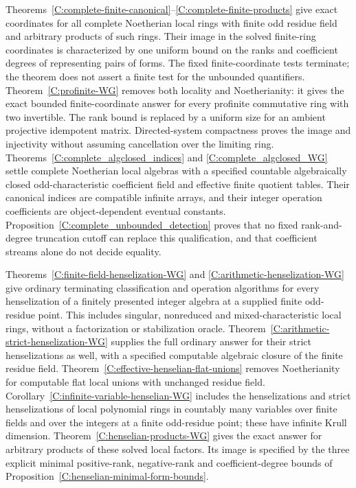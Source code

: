 \begin{remark}
Theorems~\ref{C:complete-finite-canonical}--\ref{C:complete-finite-products}
give exact coordinates for all complete Noetherian local rings with finite
odd residue field and arbitrary products of such rings.
Their image in the solved finite-ring coordinates is characterized by
one uniform bound on the ranks and coefficient degrees of representing
pairs of forms. The fixed finite-coordinate tests terminate; the theorem
does not assert a finite test for the unbounded quantifiers.
Theorem~\ref{C:profinite-WG} removes both locality and Noetherianity:
it gives the exact bounded finite-coordinate answer for every profinite
commutative ring with two invertible. The rank bound is replaced by a
uniform size for an ambient projective idempotent matrix. Directed-system
compactness proves the image and injectivity without assuming cancellation
over the limiting ring.
Theorems~\ref{C:complete_algclosed_indices} and
\ref{C:complete_algclosed_WG} settle complete Noetherian local algebras
with a specified countable algebraically closed odd-characteristic
coefficient field and effective finite quotient tables.
Their canonical indices are compatible infinite arrays, and their
integer operation coefficients are object-dependent eventual constants.
Proposition~\ref{C:complete_unbounded_detection} proves that no fixed
rank-and-degree truncation cutoff can replace this qualification,
and that coefficient streams alone do not decide equality.

Theorems~\ref{C:finite-field-henselization-WG} and
\ref{C:arithmetic-henselization-WG} give ordinary terminating
classification and operation algorithms for every henselization of a
finitely presented integer algebra at a supplied finite odd-residue point.
This includes singular, nonreduced and mixed-characteristic local rings,
without a factorization or stabilization oracle.
Theorem~\ref{C:arithmetic-strict-henselization-WG} supplies the full
ordinary answer for their strict henselizations as well, with a
specified computable algebraic closure of the finite residue field.
Theorem~\ref{C:effective-henselian-flat-unions} removes Noetherianity
for computable flat local unions with unchanged residue field.
Corollary~\ref{C:infinite-variable-henselian-WG} includes the
henselizations and strict henselizations of local polynomial rings
in countably many variables over finite fields and over the integers
at a finite odd-residue point; these have infinite Krull dimension.
Theorem~\ref{C:henselian-products-WG} gives the exact answer for
arbitrary products of these solved local factors. Its image is specified
by the three explicit minimal positive-rank, negative-rank and
coefficient-degree bounds of
Proposition~\ref{C:henselian-minimal-form-bounds}.


\end{remark}
